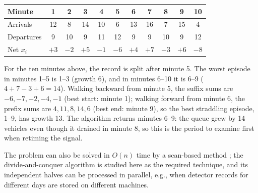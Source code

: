 \begin{center}
\footnotesize
\setlength{\tabcolsep}{3pt}
\begin{tabular}{|l|cccccccccc|}
\hline
Minute & 1 & 2 & 3 & 4 & 5 & 6 & 7 & 8 & 9 & 10 \\
\hline
Arrivals & 12 & 8 & 14 & 10 & 6 & 13 & 16 & 7 & 15 & 4 \\
Departures & 9 & 10 & 9 & 11 & 12 & 9 & 9 & 10 & 9 & 12 \\
Net $x_i$ & $+3$ & $-2$ & $+5$ & $-1$ & $-6$ & $+4$ & $+7$ & $-3$ & $+6$ & $-8$ \\
\hline
\end{tabular}
\end{center}

For the ten minutes above, the record is split after
minute 5. The worst episode in minutes 1--5 is 1--3
(growth 6), and in minutes 6--10 it is 6--9
($4 + 7 - 3 + 6 = 14$). Walking backward from minute 5,
the suffix sums are $-6, -7, -2, -4, -1$ (best start:
minute 1); walking forward from minute 6, the prefix
sums are $4, 11, 8, 14, 6$ (best end: minute 9), so the
best straddling episode, 1--9, has growth 13. The
algorithm returns minutes 6--9: the queue grew by 14
vehicles even though it drained in minute 8, so this is
the period to examine first when retiming the signal.

The problem can also be solved in $O(n)$ time by a
scan-based method \cite{bentley1984}; the
divide-and-conquer algorithm is studied here as the
required technique, and its independent halves can be
processed in parallel, e.g., when detector records for
different days are stored on different machines.

